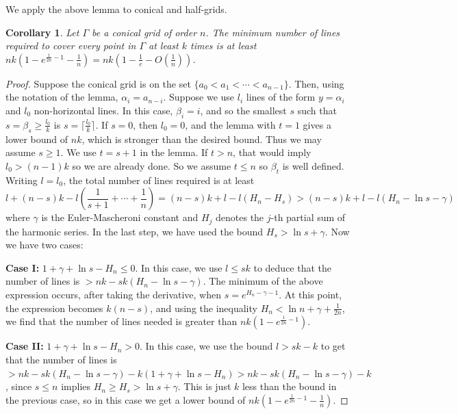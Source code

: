\documentclass[usenames,dvipsnames, 11pt]{article}
\newtheorem{cor}[thm]{Corollary}
\numberwithin{thm}{section}
\theoremstyle{definition}
\theoremstyle{definition}
\theoremstyle{definition}
\newcommand{\1}{\mathbf{1}}
\begin{document}
We apply the above lemma to conical and half-grids.

\begin{cor}
    Let $\Gamma$ be a conical grid of order $n$. The minimum number of lines required to cover every point in $\Gamma$ at least $k$ times is at least $nk\left(1-e^{\frac{1}{2n}-1}-\frac{1}{n}\right) = nk\left(1-\frac{1}{e}-O(\frac{1}{n}) \right)$.
\end{cor}
\begin{proof}
    Suppose the conical grid is on the set $\{a_0<a_1< \cdots < a_{n-1} \}$. Then, using the notation of the lemma, $\alpha_i = a_{n-i}$. Suppose we use $l_i$ lines of the form $y = \alpha_i$ and $l_0$ non-horizontal lines. 
    In this case, $\beta_i=i$, and so the smallest $s$ such that $s=\beta_s \geq \frac{l_0}{k}$ is $s=\lceil \frac{l_0}{k} \rceil$. 
    If $s=0$, then $l_0=0$, and the lemma with $t=1$ gives a lower bound
of $nk$, which is stronger than the desired bound. Thus we may assume
$s\geq 1$.
    We use $t=s+1$ in the lemma. If $t>n$, that would imply $l_0>(n-1)k$ so we are already done. So we assume $t \leq n$ so $\beta_t$ is well defined.
    Writing $l=l_0$, the total number of lines required is at least 
    $$ l+(n-s)k-l\left(\frac{1}{s+1}+\cdots+\frac{1}{n}\right) = (n-s)k+l-l(H_n-H_{s})>(n-s)k+l-l(H_n-\ln s-\gamma)$$
    where $\gamma$ is the Euler-Mascheroni constant and $H_j$ denotes the $j$-th partial sum of the harmonic series. In the last step, we have used the bound $H_{s}>\ln s +\gamma$. Now we have two cases: 
    
    \textbf{Case I:} $1+ \gamma + \ln s - H_n \leq 0$. In this case, we use $l \leq sk$ to deduce that the number of lines is $>nk-sk(H_n-\ln s-\gamma)$. 
    The minimum of the above expression occurs, after taking the derivative, when $s=e^{H_n-\gamma-1}$. At this point, the expression becomes $k(n-s)$, and using the inequality $H_n < \ln n + \gamma + \frac{1}{2n}$, we find that the number of lines needed is greater than $nk(1-e^{\frac{1}{2n}-1})$.

    \textbf{Case II:} $1+ \gamma + \ln s - H_n > 0$. In this case, we use the bound $l > sk-k$ to get that the number of lines is $>nk-sk(H_n-\ln s-\gamma)-k(1+\gamma + \ln s - H_n)>nk-sk(H_n-\ln s-\gamma)-k$, since $s \leq n$ implies $H_n \geq H_s > \ln s +\gamma$. This is just $k$ less than the bound in the previous case, so in this case we get a lower bound of $nk\left(1-e^{\frac{1}{2n}-1}-\frac{1}{n}\right)$.
\end{proof}
\end{document}
